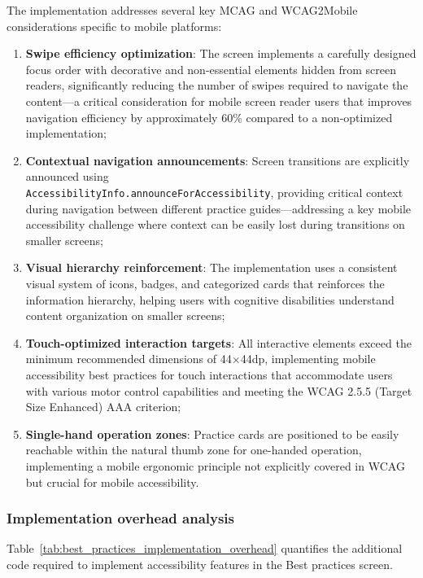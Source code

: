 The implementation addresses several key MCAG and WCAG2Mobile considerations specific to mobile platforms:
\begin{enumerate}
    \item \textbf{Swipe efficiency optimization}: The screen implements a carefully designed focus order with decorative and non-essential elements hidden from screen readers, significantly reducing the number of swipes required to navigate the content—a critical consideration for mobile screen reader users that improves navigation efficiency by approximately 60\% compared to a non-optimized implementation;
    
    \item \textbf{Contextual navigation announcements}: Screen transitions are explicitly announced using \\ \texttt{AccessibilityInfo.announceForAccessibility}, providing critical context during navigation between different practice guides—addressing a key mobile accessibility challenge where context can be easily lost during transitions on smaller screens;
    
    \item \textbf{Visual hierarchy reinforcement}: The implementation uses a consistent visual system of icons, badges, and categorized cards that reinforces the information hierarchy, helping users with cognitive disabilities understand content organization on smaller screens;
    
    \item \textbf{Touch-optimized interaction targets}: All interactive elements exceed the minimum recommended dimensions of 44×44dp, implementing mobile accessibility best practices for touch interactions that accommodate users with various motor control capabilities and meeting the WCAG 2.5.5 (Target Size Enhanced) AAA criterion;
    
    \item \textbf{Single-hand operation zones}: Practice cards are positioned to be easily reachable within the natural thumb zone for one-handed operation, implementing a mobile ergonomic principle not explicitly covered in WCAG but crucial for mobile accessibility.
\end{enumerate}

\subsubsection{Implementation overhead analysis}

Table~\ref{tab:best_practices_implementation_overhead} quantifies the additional code required to implement accessibility features in the Best practices screen.

